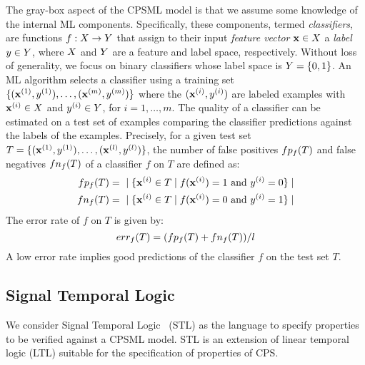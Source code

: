 The gray-box aspect of the CPSML model is that we assume some knowledge
of the internal ML components. Specifically, these components,
termed \emph{classifiers},
are functions $f : X \to Y$ that assign to their input 
\emph{feature vector} $\mathbf{x} \in X$ a \emph{label} $y \in Y$,
where $X$ and $Y$ are a feature and label space,
respectively. Without loss of generality, we focus on binary classifiers whose label space is $Y = \{0,1\}$.
An ML algorithm selects 
a classifier using a training set $\{(\mathbf{x}^{(1)},y^{(1)}),\dots,(\mathbf{x}^{(m)},y^{(m)})\}$
where the $(\mathbf{x}^{(i)},y^{(i)})$ are labeled examples with $\mathbf{x}^{(i)} \in X$ and
$y^{(i)} \in Y$, for $i = 1,\dots, m$.
The quality of a classifier can be estimated on a test set of examples 
comparing the classifier predictions 
against the labels of the examples. Precisely, for a given 
test set $T = \{(\mathbf{x}^{(1)},y^{(1)}),\dots,(\mathbf{x}^{(l)},y^{(l)})\}$,
the number of false positives $fp_{f}(T)$ and false negatives $fn_{f}(T)$ of 
a classifier $f$ on $T$ are defined as:
\begin{equation}
	\begin{split}
		fp_{f}(T) = &\ \mid \{ \mathbf{x}^{(i)} \in T \mid f(\mathbf{x}^{(i)}) = 1 \text{ and } y^{(i)} = 0 \} \mid \\
		fn_{f}(T) = &\ \mid \{ \mathbf{x}^{(i)} \in T \mid f(\mathbf{x}^{(i)}) = 0 \text{ and } y^{(i)} = 1 \} \mid \\
	\end{split}
\end{equation}
The error rate of $f$ on $T$ is given by:
\begin{equation}
	err_{f}(T) = (fp_{f}(T)+fn_{f}(T)) / l 
\end{equation}
A low error rate implies good predictions of the classifier $f$ on the test 
set $T$.

\subsection{Signal Temporal Logic}

We consider Signal Temporal Logic~\cite{maler2004monitoring}
(STL) as the language to specify properties to be verified against a CPSML model.
STL is an extension of linear temporal logic (LTL) suitable for the 
specification of properties of CPS.

